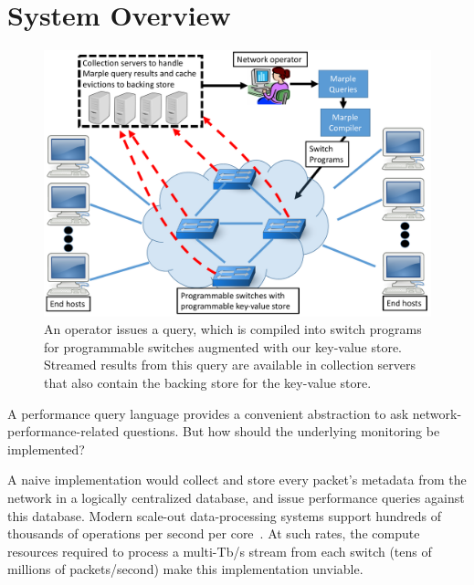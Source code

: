 \section{System Overview}
\label{s:overview}
\begin{figure}[!t]
\centering
\includegraphics[width=0.7\columnwidth]{pq_overview.pdf}
\caption{An operator issues a \TheSystem query, which is compiled into
switch programs for programmable switches augmented with our
key-value store. Streamed results from this query are available in
collection servers that also contain the backing store for the key-value
store.}
\label{fig:overview}
\end{figure}

A performance query language provides a convenient abstraction to ask
network-performance-related questions. But how should the underlying monitoring
be implemented?

A naive implementation would collect and store every packet's metadata
from the network in a logically centralized database, and issue performance
queries against this database. %
Modern scale-out data-processing systems support hundreds of thousands of
operations per second per core~\cite{kafka_benchmark, redis_benchmark,
  memcached_benchmark, redis_vs_memcached, redis_vs_memcached_update}. At such
rates, the compute resources required to process a multi-Tb/s stream from each
switch (tens of millions of packets/second) make this implementation
unviable.

